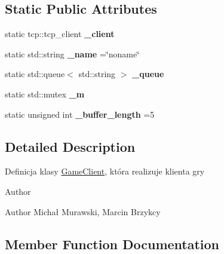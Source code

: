\subsection*{Static Public Attributes}
\begin{DoxyCompactItemize}
\item 
static tcp\+::tcp\+\_\+client {\bfseries \+\_\+client}\hypertarget{classGameClient_a0ae16fa49b4937e75ec20eb85130d35d}{}\label{classGameClient_a0ae16fa49b4937e75ec20eb85130d35d}

\item 
static std\+::string {\bfseries \+\_\+name} =\char`\"{}noname\char`\"{}\hypertarget{classGameClient_a4fc5adb552542ebc455a25a26926025d}{}\label{classGameClient_a4fc5adb552542ebc455a25a26926025d}

\item 
static std\+::queue$<$ std\+::string $>$ {\bfseries \+\_\+queue}\hypertarget{classGameClient_a32d0bcdbc1b903c4562ee8dc20b56b99}{}\label{classGameClient_a32d0bcdbc1b903c4562ee8dc20b56b99}

\item 
static std\+::mutex {\bfseries \+\_\+m}\hypertarget{classGameClient_ad079b6042d6db9bd9e19a5adcfeb313c}{}\label{classGameClient_ad079b6042d6db9bd9e19a5adcfeb313c}

\item 
static unsigned int {\bfseries \+\_\+buffer\+\_\+length} =5\hypertarget{classGameClient_aa014b8adac35373040b858fe55bc8c93}{}\label{classGameClient_aa014b8adac35373040b858fe55bc8c93}

\end{DoxyCompactItemize}


\subsection{Detailed Description}
Definicja klasy \hyperlink{classGameClient}{Game\+Client}, która realizuje klienta gry \begin{DoxyAuthor}{Author}

\end{DoxyAuthor}
\begin{DoxyParagraph}{Author}
Michał Murawski, Marcin Brzykcy 
\end{DoxyParagraph}


\subsection{Member Function Documentation}
